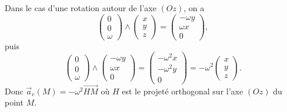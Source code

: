             \begin{example}
                Dans le cas d'une rotation autour de l'axe $(Oz)$, on a 
                \begin{equation*}
                    \begin{pmatrix}
                        0\\0\\\omega
                    \end{pmatrix}\wedge\begin{pmatrix}
                        x\\y\\z
                    \end{pmatrix}=\begin{pmatrix}
                        -\omega y\\\omega x\\0
                    \end{pmatrix},
                \end{equation*}
                puis
                \begin{equation*}
                    \begin{pmatrix}
                        0\\0\\\omega
                    \end{pmatrix}\wedge\begin{pmatrix}
                        -\omega y\\\omega x\\0
                    \end{pmatrix}=\begin{pmatrix}
                        -\omega^{2}x\\-\omega^{2}y\\0
                    \end{pmatrix}=-\omega^{2}\begin{pmatrix}
                        x\\y\\z
                    \end{pmatrix}.
                \end{equation*}
                Donc $\vec{a}_e(M)=-\omega^{2}\vec{HM}$ où $H$ est le projeté orthogonal sur l'axe $(Oz)$ du point $M$.
            \end{example}
